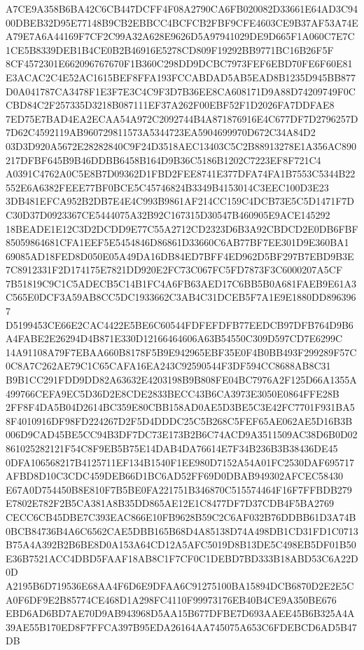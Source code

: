 \documentclass[UTF8,fontset=fandol,zihao=-4,a4paper]{ctexart}
\begin{document}
{{A7CE9A358B6BA42C6CB447DCFF4F08A2790CA6FB020082D33661E64AD3C9400DBEB32D95E77148B9CB2EBBCC4BCFCB2FBF9CFE4603CE9B37AF53A74E
A79E7A6A44169F7CF2C99A32A628E9626D5A97941029DE9D665F1A060C7E7C1CE5B8339DEB1B4CE0B2B46916E5278CD809F19292BB9771BC16B26F5F
8CF4572301E662096767670F1B360C298DD9DCBC7973FEF6EBD70FE6F60E81E3ACAC2C4E52AC1615BEF8FFA193FCCABDAD5AB5EAD8B1235D945BB877
D0A041787CA3478F1E3F7E3C4C9F3D7B36EE8CA608171D9A88D74209749F0CCBD84C2F257335D3218B087111EF37A262F00EBF52F1D2026FA7DDFAE8
7ED75E7BAD4EA2ECAA54A972C2092744B4A871876916E4C677DF7D2796257D7D62C4592119AB960729811573A5344723EA5904699970D672C34A84D2
03D3D920A5672E28282840C9F24D3518AEC13403C5C2B88913278E1A356AC890217DFBF645B9B46DDBB6458B164D9B36C5186B1202C7223EF8F721C4
A0391C4762A0C5E8B7D09362D1FBD2FEE8741E377DFA74FA1B7553C5344B22552E6A6382FEEE77BF0BCE5C45746824B3349B4153014C3EEC100D3E23
3DB481EFCA952B2DB7E4E4C993B9861AF214CC159C4DCB73E5C5D1471F7DC30D37D0923367CE5444075A32B92C167315D30547B460905E9ACE145292
18BEADE1E12C3D2DCDD9E77C55A2712CD2323D6B3A92CBDCD2E0DB6FBF85059864681CFA1EEF5E5454846D86861D33660C6AB77BF7EE301D9E360BA1
69085AD18FED8D050E05A49DA16DB84ED7BFF4ED962D5BF297B7EBD9B3E7C8912331F2D174175E7821DD920E2FC73C067FC5FD7873F3C6000207A5CF
7B51819C9C1C5ADECB5C14B1FC4A6FB63AED17C6BB5B0A681FAEB9E61A3C565E0DCF3A59AB8CC5DC1933662C3AB4C31DCEB5F7A1E9E1880DD8963967
D5199453CE66E2CAC4422E5BE6C60544FDFEFDFB77EEDCB97DFB764D9B6A4FABE2E26294D4B871E330D12166464606A63B54550C309D597CD7E6299C
14A91108A79F7EBAA660B8178F5B9E942965EBF35E0F4B0BB493F299289F57C0C8A7C262AE79C1C65CAFA16EA243C92590544F3DF594CC8688AB8C31
B9B1CC291FDD9DD82A63632E4203198B9B808FE04BC7976A2F125D66A1355A499766CEFA9EC5D36D2E8CDE2833BECC43B6CA3973E3050E0864FFE28B
2FF8F4DA5B04D2614BC359E80CBB158AD0AE5D3BE5C3E42FC7701F931BA58F4010916DF98FD224267D2F5D4DDDC25C5B268C5FEF65AE062AE5D16B3B
006D9CAD45BE5CC94B3DF7DC73E173B2B6C74ACD9A3511509AC38D6B0D02861025282121F54C8F9EB5B75E14DAB4DA76614E7F34B236B3B38436DE45
0DFA106568217B4125711EF134B1540F1EE980D7152A54A01FC2530DAF695717AFBD8D10C3CDC459DEB66D1BC6AD52FF69D0DBAB949302AFCEC58430
E67A0D754450B8E810F7B5BE0FA221751B346870C515574464F16F7FFBDB279E7802E782F2B5CA381A8B35DD865AE12E1C8477DF7D37CDB4F5BA2769
CECC6CB45DBE7C393EAC866E10FB9628B59C2C6AF032B76DDBB61D3A74B0BCB84736B4A6C6562CAE5DBB165B68D4A85138D74A498DB1CD31FD1C0713
B75A4A392B2B6BE8D0A153A64CD12A5AFC5019D8B13DE5C498EB5DF01B50E36B7521ACC4DBD5FAAF18AB8C1F7CF0C1DEBD7BD333B18ABD53C6A22D0D
A2195B6D719536E68AA4F6D6E9DFAA6C91275100BA15894DCB6870D2E2E5CA0F6DF9E2B85774CE468D1A298FC4110F99973176EB40B4CE9A350BE676
EBD6AD6BD7AE70D9AB943968D5AA15B677DFBE7D693AAEE45B6B325A4A39AE55B170ED8F7FFCA397B95EDA26164AA745075A653C6FDEBCD6AD5B47DB
}}
\end{document}
